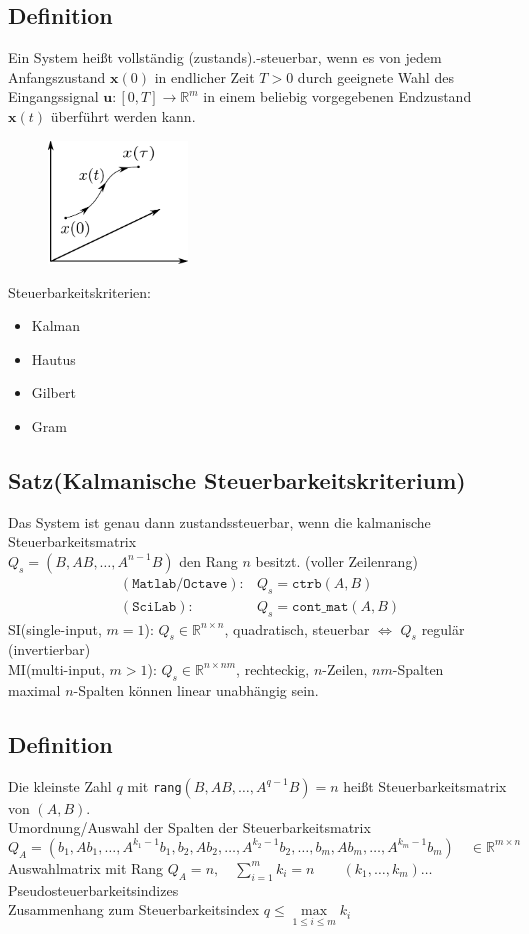 \documentclass[ngerman]{tudscrreprt}
\begin{document}
\subsection*{Definition} Ein System heißt vollständig (zustands).-steuerbar, wenn es von jedem Anfangszustand $\mathbf{x}(0)$ in endlicher Zeit $T>0$ durch geeignete Wahl des Eingangssignal $\mathbf{u}: [ 0,T] \rightarrow \mathbb{R}^{m}$ in einem beliebig vorgegebenen Endzustand $\mathbf{x}(t)$ überführt werden kann. 
\begin{figure}[H]
\centering
\def\svgwidth{200pt} 
  \includegraphics[width=3.7cm]{images/image1.pdf}
\end{figure}
Steuerbarkeitskriterien:
\begin{itemize}
\item Kalman
\item Hautus
\item Gilbert
\item Gram
\end{itemize}
\subsection*{Satz(Kalmanische Steuerbarkeitskriterium)}
Das System ist genau dann zustandssteuerbar, wenn die kalmanische Steuerbarkeitsmatrix\\ $Q_s = (B, AB,\dots, A^{n-1}B)$ den Rang $n$ besitzt. (voller Zeilenrang)
\begin{align*}
(\texttt{Matlab/Octave}):& Q_s = \texttt{ctrb}(A,B)\\
(\texttt{SciLab}):& Q_s =\texttt{cont$\_$mat}(A,B)
\end{align*}
SI(single-input, $m=1$): $Q_s \in \mathbb{R}^{n\times n}$, quadratisch, steuerbar $\iff$ $Q_s$ regulär (invertierbar)\\ 
MI(multi-input, $m>1$): $Q_s \in \mathbb{R}^{n\times nm}$, rechteckig, $n$-Zeilen, $nm$-Spalten \\ 
maximal $n$-Spalten können linear unabhängig sein. \\ 
\subsection*{Definition}Die kleinste Zahl $q$ mit \texttt{rang}$(B,AB,\dots, A^{q-1}B) = n$ heißt Steuerbarkeitsmatrix von $(A,B)$. \\ 
Umordnung/Auswahl der Spalten der Steuerbarkeitsmatrix
\begin{equation*}
Q_A = \left( b_1,Ab_1,\dots, A^{k_1 - 1}b_1, b_2, Ab_2,\dots, A^{k_2 - 1}b_2,\dots,b_m,Ab_m,\dots,A^{k_m-1}b_m \right) \quad \in \mathbb{R}^{m\times n}
\end{equation*}
Auswahlmatrix mit Rang $Q_A = n, \quad \sum\limits_{i=1}^{m} k_i = n \qquad (k_1,\dots,k_m)\dots $Pseudosteuerbarkeitsindizes\\ 
Zusammenhang zum Steuerbarkeitsindex $q \le \max\limits_{1\le i\le m}^{} k_i$\\ 
\end{document}
